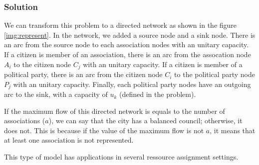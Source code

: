 \subsubsection{Solution}

We can transform this problem to a directed network as shown in the figure \ref{img:represent}. In the network, we added a source node and a sink node. There is an arc from the source node to each association nodes with an unitary capacity. If a citizen is member of an association, there is an arc from the assocation node $A_i$ to the citizen node $C_j$ with an unitary capacity. If a citizen is member of a political party, there is an arc from the citizen node $C_i$ to the political party node $P_j$ with an unitary capacity. Finally, each political party nodes have an outgoing arc to the sink, with a capacity of $u_k$ (defined in the problem).

If the maximum flow of this directed network is equals to the number of associations ($a$), we can say that the city has a balanced council; otherwise, it does not. This is because if the value of the maximum flow is not $a$, it means that at least one association is not represented.

This type of model has applications in several ressource assignment settings.



